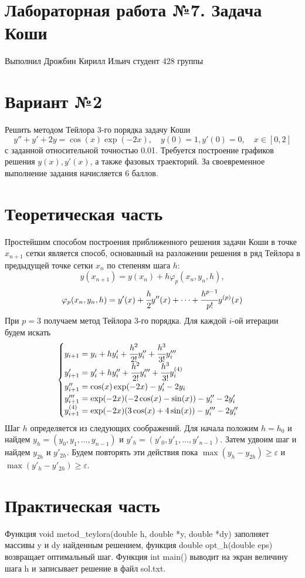\documentclass{report}
\begin{document}
\section*{Лабораторная работа №7. Задача Коши}
Выполнил Дрожбин Кирилл Ильич студент 428 группы 
\section*{Вариант №2}
Решить методом Тейлора 3-го порядка задачу Коши $$y'' + y' + 2y = \cos(x)\exp(-2x), \quad y(0) = 1, y'(0) = 0, \quad x \in [0, 2]$$ с заданной относительной точностью 0.01. Требуется построение графиков решения $y(x), y'(x)$, а также фазовых траекторий. За своевременное выполнение задания начисляется 6 баллов.
\section*{Теоретическая часть}
Простейшим способом построения приближенного решения задачи Коши в точке $x_{n+1}$ сетки является способ, основанный на разложении решения в ряд Тейлора в предыдущей точке сетки $x_n$ по степеням шага $h$: $$y(x_{n+1}) = y(x_n) + h \varphi_p (x_n, y_n, h),$$ $$\varphi_p (x_n, y_n, h) = y'(x) + \cfrac{h}{2} y''(x) + \dots + \cfrac{h^{p-1}}{p!} y^{(p)}(x)$$При $p = 3$ получаем метод Тейлора 3-го порядка. Для каждой $i$-ой итерации будем искать $$\begin{cases} y_{i+1} = y_i + h y'_i + \cfrac{h^2}{2!}y''_i + \cfrac{h^3}{3!}y'''_i \\
y'_{i+1} = y'_i + hy''_i + \cfrac{h^2}{2!}y'''_i + \cfrac{h^3}{3!}y^{(4)}_i \\
y''_{i+1} = \cos(x)\exp(-2x) - y'_i - 2y_i \\
y'''_{i+1} = \exp(-2x)(-2\cos(x) - \sin(x)) - y''_i - 2y'_i \\
y^{(4)}_{i+1} = \exp(-2x)(3\cos(x) + 4\sin(x)) - y'''_i - 2y''_i
\end{cases}$$ Шаг $h$ определяется из следующих соображений. Для начала положим $h = h_0$ и найдем $y_h = (y_0, y_1, \dots, y_{n-1})$ и $y'_h = (y'_0, y'_1, \dots, y'_{n-1})$. Затем удвоим шаг и найдем $y_{2h}$ и $y'_{2h}$. Будем повторять эти действия пока $\max(y_h - y_{2h}) \geq \varepsilon$ и $\max(y'_h - y'_{2h}) \geq \varepsilon$.
\section*{Практическая часть}
Функция void metod\_teylora(double h, double *y, double *dy) заполняет массивы y и dy найденным решением, функция double opt\_h(double eps) возвращает оптимальный шаг. Функция int main() выводит на экран величину шага h и записывает решение в файл sol.txt.
\end{document}
